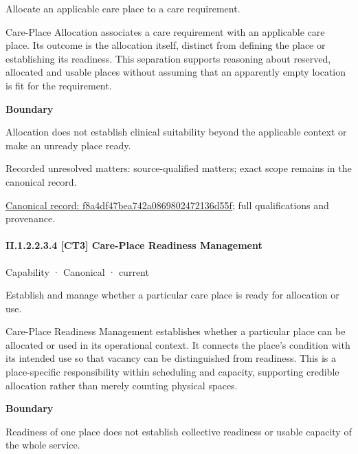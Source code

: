 Allocate an applicable care place to a care requirement.



Care-Place Allocation associates a care requirement with an applicable care place. Its outcome is the allocation itself, distinct from defining the place or establishing its readiness. This separation supports reasoning about reserved, allocated and usable places without assuming that an apparently empty location is fit for the requirement.



\textbf{Boundary}



Allocation does not establish clinical suitability beyond the applicable context or make an unready place ready.


{\small Recorded unresolved matters: source-qualified matters; exact scope remains in the canonical record.}\par
{\footnotesize \href{../../../../continuum/strategy/capability/f8a4df47bea742a0869802472136d55f.md}{Canonical record: f8a4df47bea742a0869802472136d55f}; full qualifications and provenance.}\par
\paragraph*{II.1.2.2.3.4 [CT3] Care-Place Readiness Management}
\label{navigation:II.1.2.2.3.4}

\label{element:4dd0f1b9f9334c5c80066a8974fdfb7a}
{\small Capability · Canonical · current}\par

Establish and manage whether a particular care place is ready for allocation or use.



Care-Place Readiness Management establishes whether a particular place can be allocated or used in its operational context. It connects the place's condition with its intended use so that vacancy can be distinguished from readiness. This is a place-specific responsibility within scheduling and capacity, supporting credible allocation rather than merely counting physical spaces.



\textbf{Boundary}



Readiness of one place does not establish collective readiness or usable capacity of the whole service.


